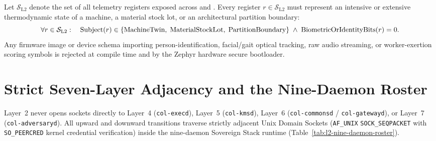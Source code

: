 \begin{invariant}
\label{inv:l2-non-panoptic}
Let $\mathcal{S}_{\mathrm{L2}}$ denote the set of all telemetry registers exposed across  and . Every register $r \in \mathcal{S}_{\mathrm{L2}}$ must represent an intensive or extensive thermodynamic state of a machine, a material stock lot, or an architectural partition boundary:
\begin{equation}
    \forall r \in \mathcal{S}_{\mathrm{L2}}: \quad \mathrm{Subject}(r) \in \{\text{\normalfont MachineTwin},\; \text{\normalfont MaterialStockLot},\; \text{\normalfont PartitionBoundary}\} \;\land\; \mathrm{BiometricOrIdentityBits}(r) = 0.
    \label{eq:l2-non-panoptic}
\end{equation}
Any firmware image or device schema importing person-identification, facial/gait optical tracking, raw audio streaming, or worker-exertion scoring symbols is rejected at compile time and by the Zephyr hardware secure bootloader.
\end{invariant}

\section{Strict Seven-Layer Adjacency and the Nine-Daemon Roster}
\label{sec:l2-strict-adjacency-daemons}

Layer~2 never opens sockets directly to Layer~4 (\texttt{col-execd}), Layer~5 (\texttt{col-kmsd}), Layer~6 (\texttt{col-commonsd} / \texttt{col-gatewayd}), or Layer~7 (\texttt{col-adversaryd}). All upward and downward transitions traverse strictly adjacent Unix Domain Sockets (\texttt{AF\_UNIX} \texttt{SOCK\_SEQPACKET} with \texttt{SO\_PEERCRED} kernel credential verification) inside the nine-daemon Sovereign Stack runtime (Table~\ref{tab:l2-nine-daemon-roster}).

